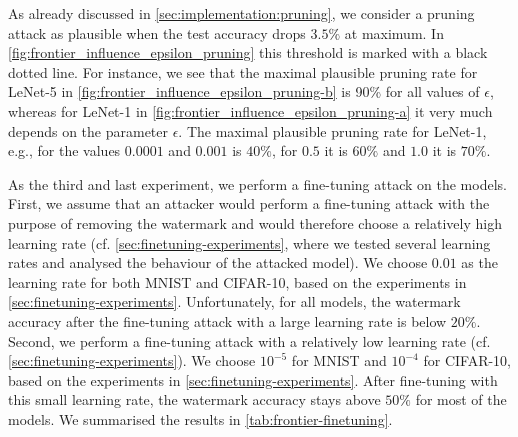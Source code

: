 

As already discussed in \cref{sec:implementation:pruning}, we consider a pruning attack as plausible when the test accuracy drops $3.5\%$ at maximum. In \cref{fig:frontier_influence_epsilon_pruning} this threshold is marked with a black dotted line. For instance, we see that the maximal plausible pruning rate for LeNet-5 in \cref{fig:frontier_influence_epsilon_pruning-b} is 90\% for all values of $\epsilon$, whereas for LeNet-1 in \cref{fig:frontier_influence_epsilon_pruning-a} it very much depends on the parameter $\epsilon$. The maximal plausible pruning rate for LeNet-1, e.g., for the values $0.0001$ and $0.001$ is $40\%$, for $0.5$ it is $60\%$ and $1.0$ it is $70\%$.


As the third and last experiment, we perform a fine-tuning attack on the models. First, we assume that an attacker would perform a fine-tuning attack with the purpose of removing the watermark and would therefore choose a relatively high learning rate (cf. \cref{sec:finetuning-experiments}, where we tested several learning rates and analysed the behaviour of the attacked model). We choose $0.01$ as the learning rate for both MNIST and CIFAR-10, based on the experiments in \cref{sec:finetuning-experiments}. Unfortunately, for all models, the watermark accuracy after the fine-tuning attack with a large learning rate is below $20\%$. Second, we perform a fine-tuning attack with a relatively low learning rate (cf. \cref{sec:finetuning-experiments}). We choose $10^{-5}$ for MNIST and $10^{-4}$ for CIFAR-10, based on the experiments in \cref{sec:finetuning-experiments}. After fine-tuning with this small learning rate, the watermark accuracy stays above $50\%$ for most of the models. We summarised the results in \cref{tab:frontier-finetuning}. %

